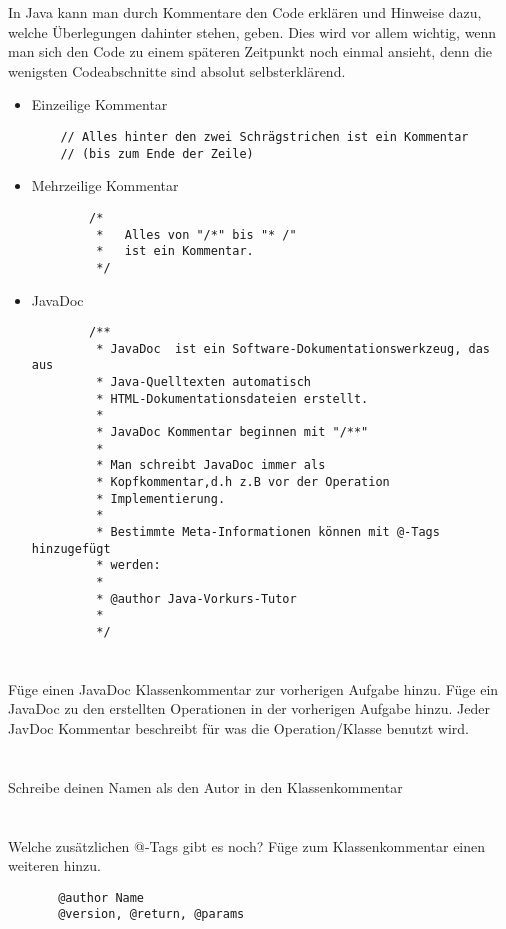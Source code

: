 \begin{questions}
    \renewcommand{\workingtimeMinutes}{10}
    In Java kann  man durch Kommentare den Code  erklären und Hinweise dazu, welche Überlegungen dahinter stehen, geben. Dies wird vor allem wichtig, wenn man sich den Code zu einem späteren Zeitpunkt noch einmal ansieht, denn die wenigsten Codeabschnitte sind absolut selbsterklärend.
    \begin{itemize}
        \item Einzeilige Kommentar
    \begin{lstlisting}
    // Alles hinter den zwei Schrägstrichen ist ein Kommentar
    // (bis zum Ende der Zeile)
    \end{lstlisting}
        \item Mehrzeilige Kommentar
        \begin{lstlisting}
        /*
         *   Alles von "/*" bis "* /"
         *   ist ein Kommentar.
         */
    \end{lstlisting}
        \item JavaDoc
        \begin{lstlisting}
        /**
         * JavaDoc  ist ein Software-Dokumentationswerkzeug, das aus
         * Java-Quelltexten automatisch
         * HTML-Dokumentationsdateien erstellt.
         *
         * JavaDoc Kommentar beginnen mit "/**"
         *
         * Man schreibt JavaDoc immer als
         * Kopfkommentar,d.h z.B vor der Operation
         * Implementierung.
         *
         * Bestimmte Meta-Informationen können mit @-Tags hinzugefügt
         * werden:
         *
         * @author Java-Vorkurs-Tutor
         *
         */
    \end{lstlisting}
    \end{itemize}
    \begin{parts}
    \part{}
        Füge einen JavaDoc Klassenkommentar zur vorherigen Aufgabe hinzu. Füge ein JavaDoc zu den erstellten Operationen in der vorherigen Aufgabe hinzu. Jeder JavDoc Kommentar beschreibt für was die Operation/Klasse benutzt wird.
    \part{}
    Schreibe deinen Namen als den Autor in den Klassenkommentar
    \part{}
    Welche zusätzlichen @-Tags gibt es noch? Füge zum Klassenkommentar einen weiteren hinzu.
    \end{parts}
    \begin{solution}
    \begin{lstlisting}
       @author Name
       @version, @return, @params


\end{lstlisting}
\end{solution}
\end{questions}
